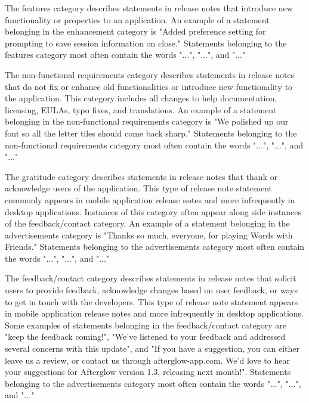 \documentclass{acm_proc_article-sp}
\begin{document}
The features category describes statements in release notes that  introduce new functionality or properties to an application.
An example of a statement belonging in the enhancement category is "Added preference setting for prompting to save session information on close."
Statements belonging to the features category most often contain the words "...", "...", and "..." 

The non-functional requirements category describes statements in release notes that do not fix or enhance old functionalities or introduce new functionality to the application.
This category includes all changes to help documentation, licensing, EULAs, typo fixes, and translations.
An example of a statement belonging in the non-functional requirements category is "We polished up our font so all the letter tiles should come back sharp."
Statements belonging to the non-functional requirements category most often contain the words "...", "...", and "..." 


The gratitude category describes statements in release notes that thank or acknowledge users of the application.
This type of release note statement commonly appears in mobile application release notes and more infrequently in desktop applications.
Instances of this category often appear along side instances of the feedback/contact category.
An example of a statement belonging in the advertisements category is "Thanks so much, everyone, for playing Words with Friends."
Statements belonging to the advertisements category most often contain the words "...", "...", and "..." 

The feedback/contact category describes statements in release notes that solicit users to provide feedback, acknowledge changes based on user feedback, or ways to get in touch with the developers.
This type of release note statement appears in mobile application release notes and more infrequently in desktop applications.
Some examples of statements belonging in the feedback/contact category are "keep the feedback coming!", "We've listened to your feedback and addressed several concerns with this update", and  "If you have a suggestion, you can either leave us a review, or contact us through afterglow-app.com. We'd love to hear your suggestions for Afterglow version 1.3, releasing next month!".
Statements belonging to the advertisements category most often contain the words "...", "...", and "..." 
\end{document}
